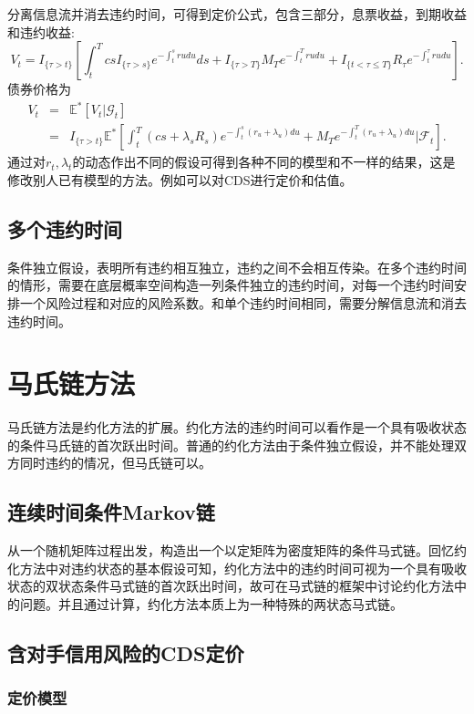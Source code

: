 \documentclass{article}
\begin{document}
分离信息流并消去违约时间，可得到定价公式，包含三部分，息票收益，到期收益和违约收益:
\begin{equation}
  V_t=I_{\{\tau>t\}} \left[\int_t^Tcs I_{\{\tau>s\}}e^{-\int_t^srudu}ds +I_{\{\tau>T\}}M_Te^{-\int_t^Trudu} +I_{\{t<\tau\le T\}}R_{\tau} e^{-\int_t^\tau rudu}\right].
  \end{equation}
债券价格为
\begin{eqnarray}
  V_t &=& \mathbb{E}^*\left[V_t|\mathcal{G}_t\right]\\ 
  &=& I_{\{\tau>t\}} \mathbb{E}^*\left[\int_t^T\left(cs+\lambda_sR_s\right)e^{-\int_t^s(r_u+\lambda_u)du} + M_Te^{-\int_t^T(r_u+\lambda_u)du} \bigg| \mathcal{F}_t\right].
\end{eqnarray}
通过对$r_t,\lambda_t$的动态作出不同的假设可得到各种不同的模型和不一样的结果，这是修改别人已有模型的方法。例如可以对CDS进行定价和估值。



  \subsection{多个违约时间}
  
  条件独立假设，表明所有违约相互独立，违约之间不会相互传染。在多个违约时间的情形，需要在底层概率空间构造一列条件独立的违约时间，对每一个违约时间安排一个风险过程和对应的风险系数。和单个违约时间相同，需要分解信息流和消去违约时间。

  \section{马氏链方法}
  马氏链方法是约化方法的扩展。约化方法的违约时间可以看作是一个具有吸收状态的条件马氏链的首次跃出时间。普通的约化方法由于条件独立假设，并不能处理双方同时违约的情况，但马氏链可以。
  \subsection{连续时间条件Markov链}
  从一个随机矩阵过程出发，构造出一个以定矩阵为密度矩阵的条件马式链。回忆约化方法中对违约状态的基本假设可知，约化方法中的违约时间可视为一个具有吸收状态的双状态条件马式链的首次跃出时间，故可在马式链的框架中讨论约化方法中的问题。并且通过计算，约化方法本质上为一种特殊的两状态马式链。
  \subsection{含对手信用风险的CDS定价}
  \subsubsection*{定价模型}
\end{document}
